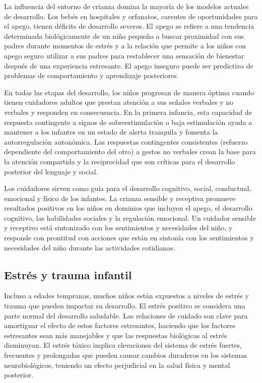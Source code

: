 \documentclass[11pt,letterpaper]{report}
\begin{document}
La influencia del entorno de crianza domina la mayoría de los modelos actuales
de desarrollo. Los bebés en hospitales y orfanatos, carentes de oportunidades
para el apego, tienen déficits de desarrollo severos. El apego se refiere a
una tendencia determinada biológicamente de un niño pequeño a buscar
proximidad con sus padres durante momentos de estrés y a la relación que
permite a los niños con apego seguro utilizar a sus padres para restablecer una
sensación de bienestar después de una experiencia estresante. El apego inseguro
puede ser predictivo de problemas de comportamiento y aprendizaje posteriores.
\cite{Nelson19}

En todas las etapas del desarrollo, los niños progresan de manera óptima
cuando tienen cuidadores adultos que prestan atención a sus señales verbales y
no verbales y responden en consecuencia. En la primera infancia, esta
capacidad de respuesta contingente a signos de sobreestimulación o baja
estimulación ayuda a mantener a los infantes en un estado de alerta tranquila y
fomenta la autorregulación autonómica. Las respuestas contingentes consistentes
(refuerzo dependiente del comportamiento del otro) a gestos no verbales crean
la base para la atención compartida y la reciprocidad que son críticas para el
desarrollo posterior del lenguaje y social. \cite{Nelson19}

Los cuidadores sirven como guía para el desarrollo cognitivo, social,
conductual, emocional y físico de los infantes. La crianza sensible y receptiva
promueve resultados positivos en los niños en dominios que incluyen el apego,
el desarrollo cognitivo, las habilidades sociales y la regulación emocional.
Un cuidador sensible y receptivo está sintonizado con los sentimientos y
necesidades del niño, y responde con prontitud con acciones que están en
sintonía con los sentimientos y necesidades del niño durante las
actividades cotidianas. \cite{Feldman3}

\subsection{Estrés y trauma infantil}
Incluso a edades tempranas, muchos niños están expuestos a niveles de estrés y
trauma que pueden impactar su desarrollo. El estrés positivo se considera una
parte normal del desarrollo saludable. Las relaciones de cuidado son clave para
amortiguar el efecto de estos factores estresantes, haciendo que los factores
estresantes sean más manejables y que las respuestas biológicas al estrés
disminuyan. El estrés tóxico implica elevaciones del sistema de estrés fuertes,
frecuentes y prolongadas que pueden causar cambios duraderos en los sistemas
neurobiológicos, teniendo un efecto perjudicial en la salud física y mental
posterior. \cite{Feldman3}
\end{document}
